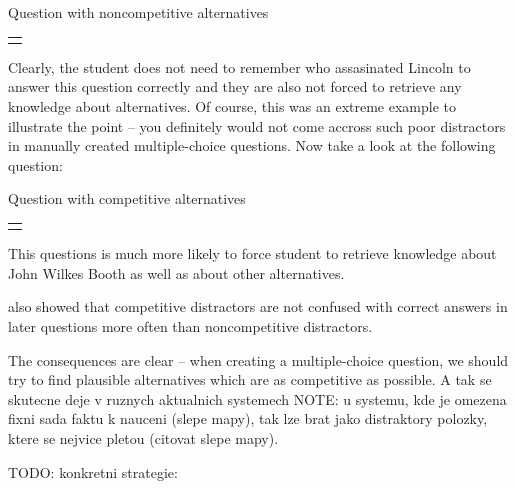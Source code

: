 \documentclass[a4paper, 12pt, twoside]{fithesis2}		%
\renewcommand{\_}{\leavevmode \kern0.0em\vbox{\hrule width0.4em}}
\newcounter{choice}
\renewcommand\thechoice{\Alph{choice}}
\newcommand\choicelabel{\thechoice.}
\newenvironment{choices}%
  {\vspace{0.8em}\list{\choicelabel}%
     {\usecounter{choice}\def\makelabel##1{\hss\llap{##1}}%
       \settowidth{\leftmargin}{W.\hskip\labelsep\hskip 0.01em}%
       \def\choice{%
         \item
       } %
       \labelwidth\leftmargin\advance\labelwidth-\labelsep
       \topsep=0pt
       \partopsep=0pt
     }%
  }%
  {\vspace{-0.7em}\endlist}
\newenvironment{question}
{
  \begin{center}
  \begin{tabular}{p{0.9\textwidth}}
  \vskip 0.05em
}
{
  \\
  \end{tabular}
  \end{center}
}
\newcommand{\sentenceGap}{\rule{1.5cm}{0.4pt}~}
\begin{document}
\begin{exercise}
\caption{Question with noncompetitive alternatives}%
  \begin{question}
  Lincoln was assassinated by \sentenceGap , a Confederate sympathizer.
  \begin{choices}
    \choice Emancipation Proclamation
    \choice John Wilkes Booth
    \choice Illinois
    \choice Department of Agriculture
  \end{choices}
  \end{question}
\end{exercise}

Clearly, the student does not need to remember who assasinated Lincoln to answer this question correctly and they are also not forced to retrieve any knowledge about alternatives.
Of course, this was an extreme example to illustrate the point -- you definitely would not come accross such poor distractors in manually created multiple-choice questions.
Now take a look at the following question:

\begin{exercise}
\caption{Question with competitive alternatives}%
  \begin{question}
  Lincoln was assassinated by \sentenceGap , a Confederate sympathizer.
  \begin{choices}
    \choice Thomas N. Conrad
    \choice Robert E. Lee
    \choice John Wilkes Booth
    \choice Ward Hill Lamon
  \end{choices}
  \end{question}
\end{exercise}

This questions is much more likely to force student to retrieve knowledge about John Wilkes Booth as well as about other alternatives.

\cite{optimizing-multiple-choice} also showed that competitive distractors are not confused with correct answers in later questions more often than noncompetitive distractors.

The consequences are clear -- when creating a multiple-choice question, we should try to find plausible alternatives which are as competitive as possible.
A tak se skutecne deje v ruznych aktualnich systemech \cite{question-gen-mitkov, slepe-mapy}
NOTE: u systemu, kde je omezena fixni sada faktu k nauceni (slepe mapy), tak lze brat jako distraktory polozky, ktere se nejvice pletou (citovat slepe mapy).

TODO: konkretni strategie:
\end{document}
